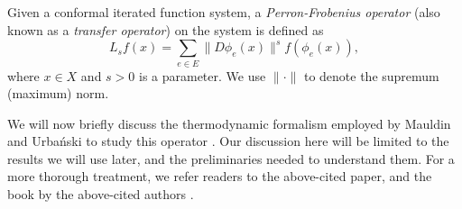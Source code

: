 \documentclass[10pt]{article}
\theoremstyle{definition}
\newtheorem{definition}{Definition}[section]
\numberwithin{equation}{section}
\numberwithin{figure}{section}
\numberwithin{table}{section}
\begin{document}

Given a conformal iterated function system, a \textit{Perron-Frobenius operator} (also known as a \textit{transfer operator}) on the system is defined as 
\begin{equation}
L_sf(x)=\sum_{e\in E}\|D\phi_e(x)\|^sf(\phi_e(x)),
\label{eq:perron}
\end{equation}
where $x\in X$ and $s>0$ is a parameter. We use $\|\cdot\|$ to denote the supremum (maximum) norm. 

We will now briefly discuss the thermodynamic formalism employed by Mauldin and Urba{\'n}ski to study this operator \cite{mauldin1996dimensions}. Our discussion here will be limited to the results we will use later, and the preliminaries needed to understand them. For a more thorough treatment, we refer readers to the above-cited paper, and the book by the above-cited authors \cite{mauldin2003graph}.
\end{document}

